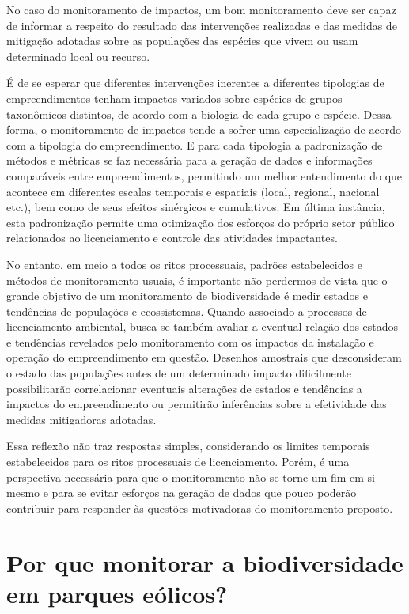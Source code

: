 \documentclass[
  oneside]{scrbook}
\begin{document}
No caso do monitoramento de impactos, um bom monitoramento deve ser capaz de informar a respeito do resultado das intervenções realizadas e das medidas de mitigação adotadas sobre as populações das espécies que vivem ou usam determinado local ou recurso.

É de se esperar que diferentes intervenções inerentes a diferentes tipologias de empreendimentos tenham impactos variados sobre espécies de grupos taxonômicos distintos, de acordo com a biologia de cada grupo e espécie. Dessa forma, o monitoramento de impactos tende a sofrer uma especialização de acordo com a tipologia do empreendimento. E para cada tipologia a padronização de métodos e métricas se faz necessária para a geração de dados e informações comparáveis entre empreendimentos, permitindo um melhor entendimento do que acontece em diferentes escalas temporais e espaciais (local, regional, nacional etc.), bem como de seus efeitos sinérgicos e cumulativos. Em última instância, esta padronização permite uma otimização dos esforços do próprio setor público relacionados ao licenciamento e controle das atividades impactantes.

No entanto, em meio a todos os ritos processuais, padrões estabelecidos e métodos de monitoramento usuais, é importante não perdermos de vista que o grande objetivo de um monitoramento de biodiversidade é medir estados e tendências de populações e ecossistemas. Quando associado a processos de licenciamento ambiental, busca-se também avaliar a eventual relação dos estados e tendências revelados pelo monitoramento com os impactos da instalação e operação do empreendimento em questão. Desenhos amostrais que desconsideram o estado das populações antes de um determinado impacto dificilmente possibilitarão correlacionar eventuais alterações de estados e tendências a impactos do empreendimento ou permitirão inferências sobre a efetividade das medidas mitigadoras adotadas.

Essa reflexão não traz respostas simples, considerando os limites temporais estabelecidos para os ritos processuais de licenciamento. Porém, é uma perspectiva necessária para que o monitoramento não se torne um fim em si mesmo e para se evitar esforços na geração de dados que pouco poderão contribuir para responder às questões motivadoras do monitoramento proposto.

\hypertarget{por-que-monitorar-a-biodiversidade-em-parques-euxf3licos}{%
\section{Por que monitorar a biodiversidade em parques eólicos?}\label{por-que-monitorar-a-biodiversidade-em-parques-euxf3licos}}
\end{document}
